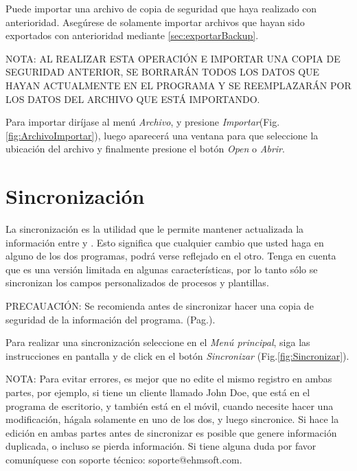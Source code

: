 Puede importar una archivo de copia de seguridad que haya realizado con anterioridad. Aseg\'urese de solamente importar archivos que hayan sido exportados con anterioridad mediante \ref{sec:exportarBackup}.

NOTA: AL REALIZAR ESTA OPERACI\'ON E IMPORTAR UNA COPIA DE SEGURIDAD ANTERIOR, SE BORRAR\'AN TODOS LOS DATOS QUE HAYAN ACTUALMENTE EN EL PROGRAMA Y SE REEMPLAZAR\'AN POR LOS DATOS DEL ARCHIVO QUE EST\'A IMPORTANDO.

Para importar dir\'ijase al men\'u \emph{Archivo}, y presione \emph{Importar}(Fig.\ref{fig:ArchivoImportar}), luego aparecer\'a una ventana para que seleccione la ubicaci\'on del archivo y finalmente presione el bot\'on \emph{Open} o \emph{Abrir}.


\section{Sincronizaci\'on}

La sincronizaci\'on es la utilidad que le permite mantener actualizada la informaci\'on entre \softwareAbogadosDesktop y \softwareAbogadosMobile. Esto significa que cualquier cambio que usted haga en alguno de los dos programas, podr\'a verse reflejado en el otro. Tenga en cuenta que \softwareAbogadosMobile es una versi\'on limitada en algunas caracter\'isticas, por lo tanto s\'olo se sincronizan los campos personalizados de procesos y plantillas.

PRECAUACI\'ON: Se recomienda antes de sincronizar hacer una copia de seguridad de la informaci\'on del programa. (Pag.\pageref{sec:exportarBackup}).

Para realizar una sincronizaci\'on seleccione en el \emph{Men\'u principal}, siga las instrucciones en pantalla y de click en el bot\'on \emph{Sincronizar} (Fig.\ref{fig:Sincronizar}). 
  

NOTA: Para evitar errores, es mejor que no edite el mismo registro en ambas partes, por ejemplo, si tiene un cliente llamado John Doe, que est\'a en el programa de escritorio, y tambi\'en est\'a en el m\'ovil, cuando necesite hacer una modificaci\'on, h\'agala solamente en uno de los dos, y luego sincronice. Si hace la edici\'on en ambas partes antes de sincronizar es posible que genere informaci\'on duplicada, o incluso se pierda informaci\'on. Si tiene alguna duda por favor comun\'iquese con soporte t\'ecnico: \mbox{soporte@ehmsoft.com}.

